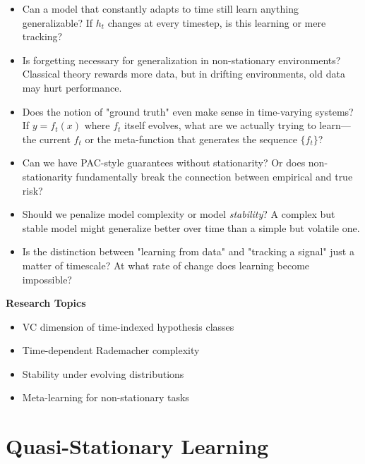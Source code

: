   \begin{itemize}
    \item Can a model that constantly adapts to time still learn anything
      generalizable? If $h_{t}$ changes at every timestep, is this learning
      or mere tracking?

    \item Is forgetting necessary for generalization in non-stationary environments?
      Classical theory rewards more data, but in drifting environments,
      old data may hurt performance.

    \item Does the notion of "ground truth" even make sense in time-varying
      systems? If $y = f_{t}(x)$ where $f_{t}$ itself evolves, what are we
      actually trying to learn—the current $f_{t}$ or the meta-function that
      generates the sequence $\{f_{t}\}$?

    \item Can we have PAC-style guarantees without stationarity? Or does
      non-stationarity fundamentally break the connection between
      empirical and true risk?

    \item Should we penalize model complexity or model \textit{stability}?
      A complex but stable model might generalize better over time than a
      simple but volatile one.

    \item Is the distinction between "learning from data" and "tracking
      a signal" just a matter of timescale? At what rate of change does
      learning become impossible?
  \end{itemize}

  \textbf{Research Topics}

  \begin{itemize}
    \item VC dimension of time-indexed hypothesis classes

    \item Time-dependent Rademacher complexity

    \item Stability under evolving distributions

    \item Meta-learning for non-stationary tasks
  \end{itemize}

  \section{Quasi-Stationary Learning}

